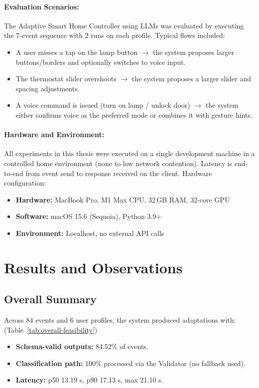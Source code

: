 \documentclass[openany]{book}
\begin{document}
\paragraph{Evaluation Scenarios:}
The Adaptive Smart Home Controller using LLMs was evaluated by executing the 7-event sequence with 2 runs on each profile. Typical flows included:
\begin{itemize}
    \item A user misses a tap on the lamp button $\rightarrow$ the system proposes larger buttons/borders and optionally switches to voice input.
    \item The thermostat slider overshoots $\rightarrow$ the system proposes a larger slider and spacing adjustments.
    \item A voice command is issued (turn on lamp / unlock door) $\rightarrow$ the system either confirms voice as the preferred mode or combines it with gesture hints.
\end{itemize}

\paragraph{Hardware and Environment:}
All experiments in this thesis were executed on a single development machine in a controlled home environment (none to low network contention). Latency is end-to-end from event send to response received on the client.
Hardware configuration:
\begin{itemize}
    \item \textbf{Hardware:} MacBook Pro, M1 Max CPU, 32\,GB RAM, 32-core GPU
    \item \textbf{Software:} macOS 15.6 (Sequoia), Python 3.9+
    \item \textbf{Environment:} Localhost, no external API calls
\end{itemize}
\newpage
\section{Results and Observations}
\subsection{Overall Summary}
Across 84 events and 6 user profiles, the system produced adaptations with: (Table~\ref{tab:overall-feasibility})
\begin{itemize}
    \item \textbf{Schema-valid outputs:} 84.52\% of events.
    \item \textbf{Classification path:} 100\% processed via the Validator (no fallback used).
    \item \textbf{Latency:} p50 13.19 s, p90 17.13 s, max 21.10 s.
\end{itemize}
\end{document}
